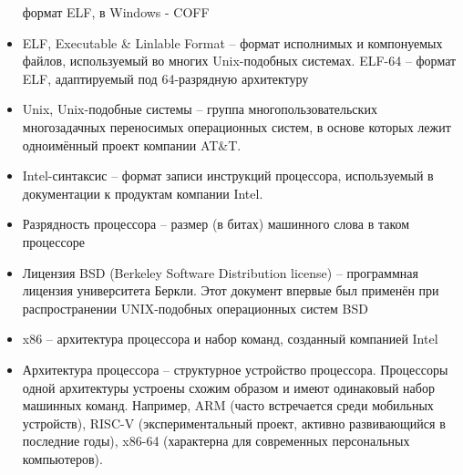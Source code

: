 \documentclass[a4paper]{article}
\begin{document}
\begin{itemize}
			формат ELF, в Windows - COFF
		\item ELF, Executable \& Linlable Format -- формат исполнимых и
			компонуемых файлов, используемый во многих
			Unix-подобных системах. ELF-64 -- формат ELF,
			адаптируемый под 64-разрядную архитектуру
		\item Unix, Unix-подобные системы -- группа
			многопользовательских многозадачных переносимых
			операционных систем, в основе которых лежит одноимённый
			проект компании AT\&T.
		\item Intel-синтаксис -- формат записи инструкций процессора,
			используемый в документации к продуктам компании Intel.
		\item Разрядность процессора -- размер (в битах) машинного
			слова в таком процессоре
		\item Лицензия BSD (Berkeley Software Distribution license) --
			программная лицензия университета Беркли. Этот документ
			впервые был применён при распространении UNIX-подобных
			операционных систем BSD
		\item x86 -- архитектура процессора и набор команд, созданный
			компанией Intel
		\item Архитектура процессора -- структурное устройство
			процессора. Процессоры одной архитектуры устроены схожим
			образом и имеют одинаковый набор машинных команд.
			Например, ARM (часто встречается среди мобильных
			устройств), RISC-V (экспериментальный проект, активно
			развивающийся в последние годы), x86-64 (характерна для
			современных персональных компьютеров).  \end{itemize}
\end{document}
